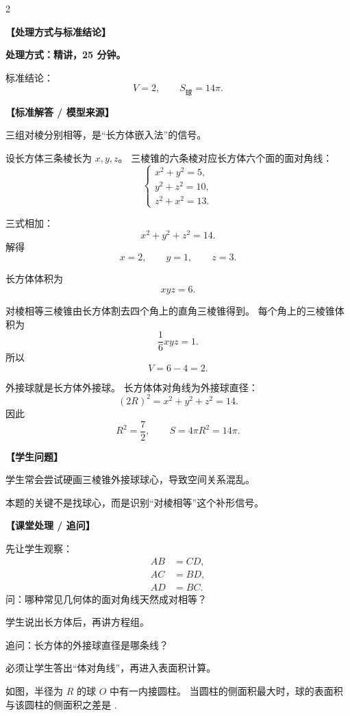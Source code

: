 \documentclass[11pt,a4paper]{ctexart}
\providecommand{\teachblock}[2]{%
  \par\addvspace{0.55em}%
  \noindent\textbf{【#1】}\par\nobreak
  \begingroup
    \raggedright
    \setlength{\parskip}{0.35em}%
    #2\par
  \endgroup
}
\newcommand{\topicteacherproblem}[2]{%
  \teachquestionheader{#1\quad #2}
}
\begin{document}
\begin{paracol}{2}
\teachblock{处理方式与标准结论}{
  \textbf{处理方式：精讲，25 分钟。}

  标准结论：
  \[
    V=2,\qquad S_{\text{球}}=14\pi.
  \]
}

\teachblock{标准解答 / 模型来源}{
  三组对棱分别相等，是“长方体嵌入法”的信号。

  设长方体三条棱长为 $x,y,z$。
  三棱锥的六条棱对应长方体六个面的面对角线：
  \[
  \begin{cases}
    x^2+y^2=5,\\
    y^2+z^2=10,\\
    z^2+x^2=13.
  \end{cases}
  \]

  三式相加：
  \[
    x^2+y^2+z^2=14.
  \]
  解得
  \[
    x=2,\qquad y=1,\qquad z=3.
  \]

  长方体体积为
  \[
    xyz=6.
  \]

  对棱相等三棱锥由长方体割去四个角上的直角三棱锥得到。
  每个角上的三棱锥体积为
  \[
    \frac16xyz=1.
  \]
  所以
  \[
    V=6-4=2.
  \]

  外接球就是长方体外接球。
  长方体体对角线为外接球直径：
  \[
    (2R)^2=x^2+y^2+z^2=14.
  \]
  因此
  \[
    R^2=\frac72,
    \qquad
    S=4\pi R^2=14\pi.
  \]
}

\switchcolumn
\teachblock{学生问题}{
  学生常会尝试硬画三棱锥外接球球心，导致空间关系混乱。

  本题的关键不是找球心，而是识别“对棱相等”这个补形信号。
}

\teachblock{课堂处理 / 追问}{
  先让学生观察：
  \[
  \begin{aligned}
    AB&=CD,\\
    AC&=BD,\\
    AD&=BC.
  \end{aligned}
  \]
  问：哪种常见几何体的面对角线天然成对相等？

  学生说出长方体后，再讲方程组。

  追问：长方体的外接球直径是哪条线？

  必须让学生答出“体对角线”，再进入表面积计算。
}
\end{paracol}

\topicteacherproblem{提升}{球内接圆柱侧面积最值}
\begingroup
\small
如图，半径为 $R$ 的球 $O$ 中有一内接圆柱。
当圆柱的侧面积最大时，球的表面积与该圆柱的侧面积之差是 \blank{1.8cm}.
\par
\endgroup
\begin{center}
  \qSolidSphereInscribedCylinderMaxAreaFigure[1.15]
\end{center}
\end{document}
